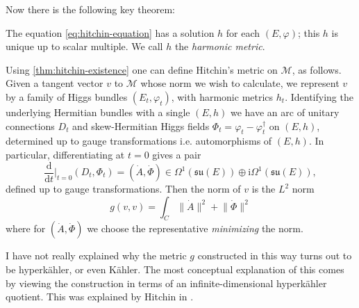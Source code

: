 \documentclass[12pt,letterpaper,reqno]{article}
\numberwithin{equation}{section}
\newcommand{\fsu}{{\mathfrak{su}}}
\newcommand{\cM}{\ensuremath{\mathcal M}}
\newcommand{\kahler}{K\"ahler\xspace}
\newcommand{\hk}{hyperk\"ahler\xspace}
\newcommand{\Hk}{Hyperk\"ahler\xspace}
\newcommand{\I}{{\mathrm i}}
\newcommand{\de}{\mathrm{d}}
\newcommand{\norm}[1]{\lVert#1\rVert}
\newcommand{\ti}[1]{\textit{#1}}
\begin{document}
Now there is the following key theorem:
\begin{thm} \label{thm:hitchin-existence}
The equation \eqref{eq:hitchin-equation} has a solution $h$ for each $(E,\varphi)$;
this $h$ is unique up to scalar multiple.
We call $h$ the \ti{harmonic metric}.
\end{thm}

Using \autoref{thm:hitchin-existence}
one can define Hitchin's metric on $\cM$, as follows.
Given a tangent vector $v$ to $\cM$ whose norm we wish to calculate, we represent $v$ by a family of Higgs bundles
$(E_t,\varphi_t)$, with harmonic metrics $h_t$.
Identifying the underlying Hermitian bundles with a single $(E,h)$
we have an arc of unitary connections $D_t$ and skew-Hermitian 
Higgs fields $\Phi_t = \varphi_t - \varphi_t^\dagger$ 
on $(E,h)$, determined up to gauge transformations i.e. 
automorphisms of $(E,h)$.
In particular, differentiating at $t = 0$ gives a pair
\begin{equation}
\frac{\de}{\de t}\Bigg\rvert_{t=0} (D_t, \Phi_t) = 
(\dot A, \dot \Phi) \in \Omega^1(\fsu(E)) \oplus \I \Omega^{1}(\fsu(E)),
\end{equation}
defined up to gauge transformations.
Then the norm of $v$ is the $L^2$ norm
\begin{equation} \label{eq:l2-metric-def}
  g(v,v) = \int_C \norm{\dot A}^2 + \norm{\dot \Phi}^2
\end{equation}
where for $(\dot A, \dot \Phi)$ we choose the representative
\ti{minimizing} the norm.

\begin{remark}[\Hk quotient] I have not really explained
why the metric $g$ constructed in this way turns out to 
be \hk, or even \kahler. The most conceptual explanation
of this comes by viewing the construction in terms of 
an infinite-dimensional \hk quotient.
This was explained by
Hitchin in \cite{MR89a:32021}.

\end{remark}

\end{document}
